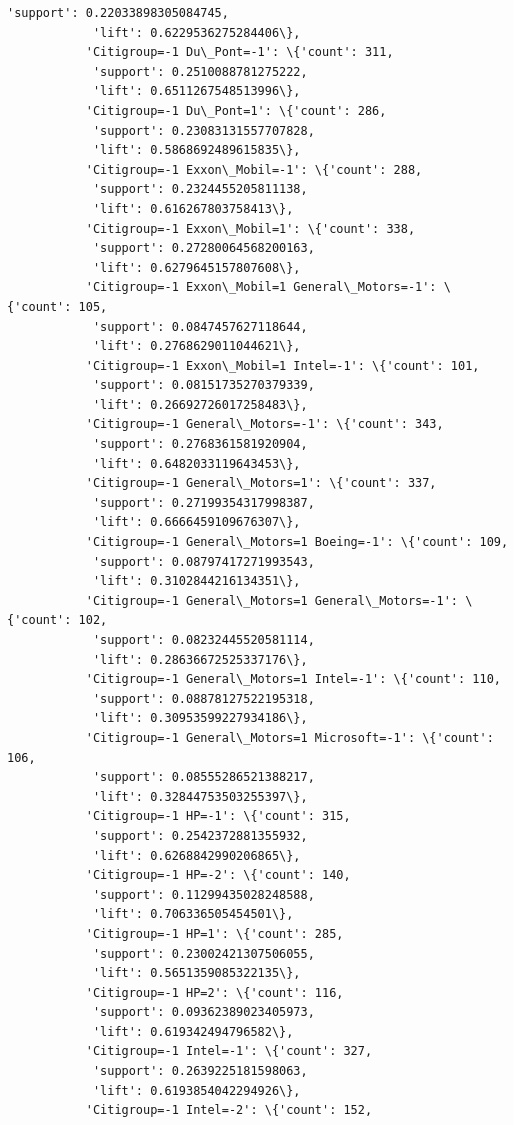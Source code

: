 \documentclass[11pt]{article}
\begin{document}
\begin{Verbatim}[commandchars=\\\{\}]
            'support': 0.22033898305084745,
            'lift': 0.6229536275284406\},
           'Citigroup=-1 Du\_Pont=-1': \{'count': 311,
            'support': 0.2510088781275222,
            'lift': 0.6511267548513996\},
           'Citigroup=-1 Du\_Pont=1': \{'count': 286,
            'support': 0.23083131557707828,
            'lift': 0.5868692489615835\},
           'Citigroup=-1 Exxon\_Mobil=-1': \{'count': 288,
            'support': 0.2324455205811138,
            'lift': 0.616267803758413\},
           'Citigroup=-1 Exxon\_Mobil=1': \{'count': 338,
            'support': 0.27280064568200163,
            'lift': 0.6279645157807608\},
           'Citigroup=-1 Exxon\_Mobil=1 General\_Motors=-1': \{'count': 105,
            'support': 0.0847457627118644,
            'lift': 0.2768629011044621\},
           'Citigroup=-1 Exxon\_Mobil=1 Intel=-1': \{'count': 101,
            'support': 0.08151735270379339,
            'lift': 0.26692726017258483\},
           'Citigroup=-1 General\_Motors=-1': \{'count': 343,
            'support': 0.2768361581920904,
            'lift': 0.6482033119643453\},
           'Citigroup=-1 General\_Motors=1': \{'count': 337,
            'support': 0.27199354317998387,
            'lift': 0.6666459109676307\},
           'Citigroup=-1 General\_Motors=1 Boeing=-1': \{'count': 109,
            'support': 0.08797417271993543,
            'lift': 0.3102844216134351\},
           'Citigroup=-1 General\_Motors=1 General\_Motors=-1': \{'count': 102,
            'support': 0.08232445520581114,
            'lift': 0.28636672525337176\},
           'Citigroup=-1 General\_Motors=1 Intel=-1': \{'count': 110,
            'support': 0.08878127522195318,
            'lift': 0.30953599227934186\},
           'Citigroup=-1 General\_Motors=1 Microsoft=-1': \{'count': 106,
            'support': 0.08555286521388217,
            'lift': 0.32844753503255397\},
           'Citigroup=-1 HP=-1': \{'count': 315,
            'support': 0.2542372881355932,
            'lift': 0.6268842990206865\},
           'Citigroup=-1 HP=-2': \{'count': 140,
            'support': 0.11299435028248588,
            'lift': 0.706336505454501\},
           'Citigroup=-1 HP=1': \{'count': 285,
            'support': 0.23002421307506055,
            'lift': 0.5651359085322135\},
           'Citigroup=-1 HP=2': \{'count': 116,
            'support': 0.09362389023405973,
            'lift': 0.619342494796582\},
           'Citigroup=-1 Intel=-1': \{'count': 327,
            'support': 0.2639225181598063,
            'lift': 0.6193854042294926\},
           'Citigroup=-1 Intel=-2': \{'count': 152,

\end{Verbatim}
\end{document}
